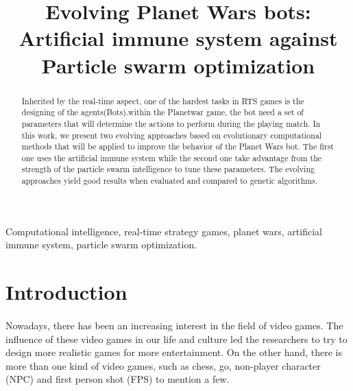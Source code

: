 \documentclass[]{interact}
\theoremstyle{plain}%
\theoremstyle{definition}
\theoremstyle{remark}
\begin{document}

\title{Evolving Planet Wars bots: Artificial immune system against Particle swarm optimization}

\author{
}

\maketitle

\begin{abstract}
Inherited by the real-time aspect, one of the hardest tasks in RTS games is the designing of the agents(Bots).within the Planetwar game, the bot need a set of parameters that will determine the actions to perform during the playing match. In this work, we present two evolving approaches based on evolutionary computational methods that will be applied to improve the behavior of the Planet Wars bot. The first one uses the artificial immune system while the second one take advantage from the strength of the particle swarm intelligence to tune these parameters. The evolving approaches yield good results when  evaluated and compared to genetic algorithms.
\end{abstract}

\begin{keywords}
Computational intelligence, real-time strategy
games, planet wars, artificial immune system, particle swarm optimization.
\end{keywords}


\section{Introduction}
\paragraph*{} 
Nowadays, there has been an increasing interest in the field of video games. The influence of these video games in our life and culture led the researchers to try to design more realistic games for more entertainment. On the other hand, there is more than one kind of video games, such as chess, go, non-player character (NPC) and first
person shot (FPS) to mention a few. 
\end{document}
